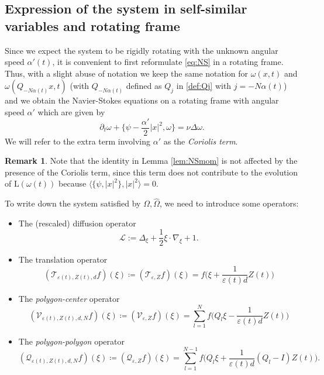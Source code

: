 \documentclass[11pt,reqno,a4paper]{amsart}
\def\eps{\varepsilon}
\def\de{{\partial}}
\newcommand{\cL}{\mathcal{L}}
\newcommand{\cQ}{\mathcal{Q}}
\newcommand{\cT}{\mathcal{T}}
\newcommand{\cV}{\mathcal{V}}
\newcommand{\1}{\mathbbm{1}}
\theoremstyle{definition}
\newtheorem{remark}[proposition]{Remark}
\theoremstyle{definition}
\numberwithin{equation}{section}
\begin{document}
\subsection{Expression of the system in self-similar variables and rotating frame}
Since we expect the system to be rigidly rotating with the unknown angular speed $\alpha'(t)$, it is convenient to first reformulate \cref{eq:NS} in a rotating frame. Thus, with a slight abuse of notation we keep the same notation for $\omega(x,t)$ and $\omega(Q_{-N\alpha(t)}x,t)$ (with $Q_{-N\alpha(t)}$ defined as $Q_j$ in \cref{def:Qj} with $j=-N\alpha(t)$) and we obtain the Navier-Stokes equations on a rotating frame with angular speed $\alpha'$ which are given by 
\begin{equation}
    \label{eq:NSrot}
    \de_t\omega+\big\{\psi-\frac{\alpha'}{2}|x|^2,\omega\big\}=\nu\Delta\omega.
\end{equation}
We will refer to the extra term involving $\alpha'$ as the \textit{Coriolis term}.
\begin{remark}
    Note that the identity in Lemma \ref{lem:NSmom} is not affected by the presence of the Coriolis term, since this term does not contribute to the evolution of $\mathrm{L}(\omega(t))$ because $\langle \{\psi,|x|^2\},|x|^2\rangle=0$.
\end{remark}
To write down the system satisfied by $\Omega,\widehat{\Omega}$, we need to introduce some operators: 
\begin{itemize}
    \item The (rescaled) diffusion operator 
    \begin{equation}
    \label{def:cL}
    \cL:=\Delta_\xi+\frac12 \xi \cdot \nabla_\xi +1.
\end{equation}
\item The translation operator 
\begin{equation}
\label{def:Teps}
(\cT_{\eps(t),Z(t),d} f)(\xi)\coloneqq(\cT_{\eps,Z} f)(\xi)=f\Big(\xi+\frac{1}{\eps(t) d}Z(t)\Big)
\end{equation}

\item The \emph{polygon-center} operator
\begin{equation}
\label{def:Veps}
    (\cV_{\eps(t),Z(t),d,N} f)(\xi)\coloneqq(\cV_{\eps,Z} f)(\xi)=\sum_{l=1}^Nf\Big(Q_{l}\xi-\frac{1}{\eps(t) d}Z(t)\Big)
\end{equation}
\item The \emph{polygon-polygon} operator 
\begin{equation}
\label{def:Qeps}
    (\cQ_{\eps(t),Z(t),d,N} f)(\xi)\coloneqq(\cQ_{\eps,Z} f)(\xi)=\sum_{l=1}^{N-1}f\Big(Q_l\xi+\frac{1}{\eps(t) d}(Q_l-I)Z(t)\Big).
\end{equation}
\end{itemize}
\end{document}
